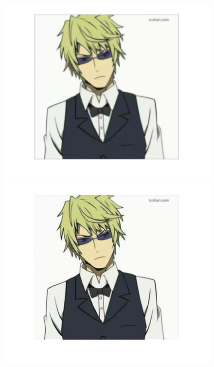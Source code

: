 \documentclass{article}
\theoremstyle{plain} \newtheorem{thm}{Theorem}
\begin{document}
\begin{figure}
\begin{minipage}{.5\linewidth}
	\end{minipage}
	\begin{minipage}{.5\linewidth}
		\includegraphics[width=\textwidth]{shizuwo_blurred.jpg}
	\end{minipage}
	\begin{minipage}{.5\linewidth}
		\includegraphics[width=\linewidth]{shizuwo_recovered.jpg}
	\end{minipage}
	\begin{minipage}{.5\linewidth}

\end{minipage}
\end{figure}
\end{document}
